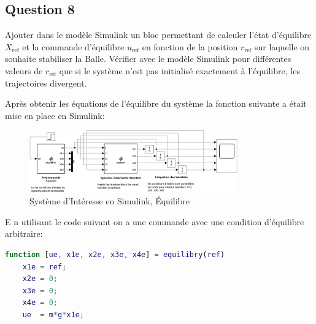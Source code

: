\documentclass[class=article, crop=false]{standalone}
\begin{document}
\subsection{Question 8}
\begin{exercise}
    Ajouter dans le modèle Simulink un bloc permettant de calculer l'état d'équilibre $X_{\text{ref}}$ et la commande d'équilibre $u_{\text{ref}}$ en fonction de la position $r_{\text{ref}}$ sur laquelle on souhaite stabiliser la Balle. Vérifier avec le modèle Simulink pour différentes valeurs de $r_{\text{ref}}$ que si le système n'est pas initialisé exactement à l'équilibre, les trajectoires divergent.
\end{exercise}
\begin{resolution}
    Après obtenir les équations de l'équilibre du système la fonction suivante a était mise en place en Simulink:
    \begin{figure}[H]
        \centering
        \includegraphics[width = 0.8\textwidth]{../images/system_simulink_20.png}
        \caption{Système d'Intéresse en Simulink, Équilibre}
        \label{fig:simulink_system_equilibry}
    \end{figure}
    E n utilisant le code suivant on a une commande avec une condition d'équilibre arbitraire:
    \begin{scriptsize}\mycode
        \begin{lstlisting}[language=Matlab]
function [ue, x1e, x2e, x3e, x4e] = equilibry(ref)
    x1e = ref;
    x2e = 0;
    x3e = 0;
    x4e = 0;
    ue  = m*g*x1e; 
        \end{lstlisting}
    \end{scriptsize}


\end{resolution}
\end{document}
